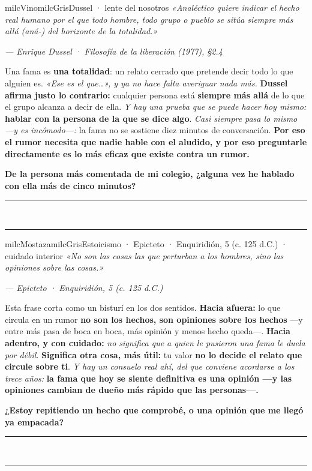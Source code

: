 \documentclass[11pt,letterpaper]{article}
\newcommand{\linead}[1]{\noindent\color{milcLinea}\rule{#1}{0.5pt}\color{milcNegro}}
\begin{document}
\begin{softbox}{milcVino}{milcGris}{Dussel · lente del nosotros}
\textit{«Analéctico quiere indicar el hecho real humano por el que todo hombre, todo grupo o pueblo se sitúa siempre más allá (aná-) del horizonte de la totalidad.»}

{\footnotesize\itshape\color{milcNegro!70}--- Enrique Dussel · Filosofía de la liberación (1977), §2.4}

Una fama es \textbf{una totalidad}: un relato cerrado que pretende decir todo lo que alguien es. \emph{«Ese es el que\ldots», y ya no hace falta averiguar nada más.} \textbf{Dussel afirma justo lo contrario:} cualquier persona está \textbf{siempre más allá} de lo que el grupo alcanza a decir de ella. \emph{Y hay una prueba que se puede hacer hoy mismo:} \textbf{hablar con la persona de la que se dice algo}. \emph{Casi siempre pasa lo mismo ---y es incómodo---:} la fama no se sostiene diez minutos de conversación. \textbf{Por eso el rumor necesita que nadie hable con el aludido, y por eso preguntarle directamente es lo más eficaz que existe contra un rumor.}

\textbf{De la persona más comentada de mi colegio, ¿alguna vez he hablado con ella más de cinco minutos?}
\end{softbox}
\linead{\linewidth}\\[1mm]
\linead{\linewidth}

\begin{softbox}{milcMostaza}{milcGris}{Estoicismo · Epicteto · Enquiridión, 5 (c. 125 d.C.) · cuidado interior}
\textit{«No son las cosas las que perturban a los hombres, sino las opiniones sobre las cosas.»}

{\footnotesize\itshape\color{milcNegro!70}--- Epicteto · Enquiridión, 5 (c. 125 d.C.)}

Esta frase corta como un bisturí en los dos sentidos. \textbf{Hacia afuera:} lo que circula en un rumor \textbf{no son los hechos, son opiniones sobre los hechos} ---y entre más pasa de boca en boca, más opinión y menos hecho queda---. \textbf{Hacia adentro, y con cuidado:} \emph{no significa que a quien le pusieron una fama le duela por débil}. \textbf{Significa otra cosa, más útil:} tu valor \textbf{no lo decide el relato que circule sobre ti}. \emph{Y hay un consuelo real ahí, del que conviene acordarse a los trece años:} \textbf{la fama que hoy se siente definitiva es una opinión ---y las opiniones cambian de dueño más rápido que las personas---.}

\textbf{¿Estoy repitiendo un hecho que comprobé, o una opinión que me llegó ya empacada?}
\end{softbox}
\linead{\linewidth}\\[1mm]
\linead{\linewidth}
\end{document}
